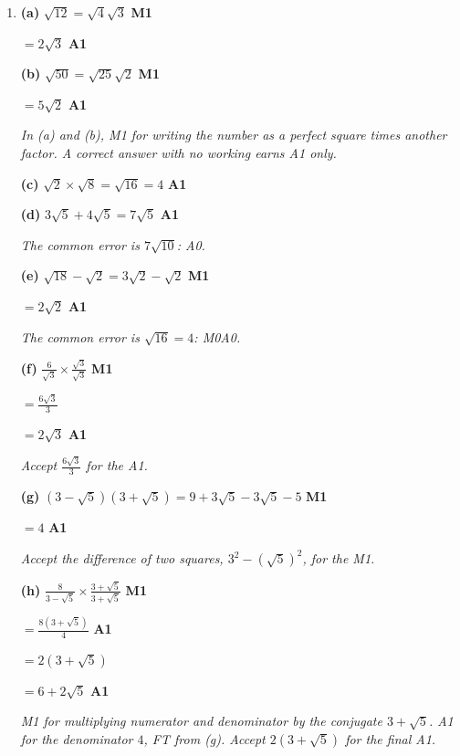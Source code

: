 \documentclass[12pt, twoside]{article}
\begin{document}
\begin{enumerate}[itemsep=0.3cm]
\newpage

\item[2.] [Maximum mark: 15]

\textbf{(a)} $\sqrt{12} = \sqrt{4}\sqrt{3}$ \hfill \textbf{M1}

$= 2\sqrt{3}$ \hfill \textbf{A1}

\textbf{(b)} $\sqrt{50} = \sqrt{25}\sqrt{2}$ \hfill \textbf{M1}

$= 5\sqrt{2}$ \hfill \textbf{A1}

\emph{In (a) and (b), M1 for writing the number as a perfect square times
another factor. A correct answer with no working earns A1 only.}

\textbf{(c)} $\sqrt{2} \times \sqrt{8} = \sqrt{16} = 4$ \hfill \textbf{A1}

\textbf{(d)} $3\sqrt{5} + 4\sqrt{5} = 7\sqrt{5}$ \hfill \textbf{A1}

\emph{The common error is $7\sqrt{10}$: A0.}

\textbf{(e)} $\sqrt{18} - \sqrt{2} = 3\sqrt{2} - \sqrt{2}$ \hfill \textbf{M1}

$= 2\sqrt{2}$ \hfill \textbf{A1}

\emph{The common error is $\sqrt{16} = 4$: M0A0.}

\textbf{(f)} $\frac{6}{\sqrt{3}} \times \frac{\sqrt{3}}{\sqrt{3}}$ \hfill \textbf{M1}

$= \frac{6\sqrt{3}}{3}$

$= 2\sqrt{3}$ \hfill \textbf{A1}

\emph{Accept $\frac{6\sqrt{3}}{3}$ for the A1.}

\textbf{(g)} $\left(3 - \sqrt{5}\right)\left(3 + \sqrt{5}\right) = 9 + 3\sqrt{5} - 3\sqrt{5} - 5$ \hfill \textbf{M1}

$= 4$ \hfill \textbf{A1}

\emph{Accept the difference of two squares, $3^{2} - \left(\sqrt{5}\right)^{2}$,
for the M1.}

\textbf{(h)} $\frac{8}{3 - \sqrt{5}} \times \frac{3 + \sqrt{5}}{3 + \sqrt{5}}$ \hfill \textbf{M1}

$= \frac{8\left(3 + \sqrt{5}\right)}{4}$ \hfill \textbf{A1}

$= 2\left(3 + \sqrt{5}\right)$

$= 6 + 2\sqrt{5}$ \hfill \textbf{A1}

\emph{M1 for multiplying numerator and denominator by the conjugate
$3 + \sqrt{5}$. A1 for the denominator $4$, FT from (g). Accept
$2\left(3 + \sqrt{5}\right)$ for the final A1.}

\end{enumerate}
\end{document}
